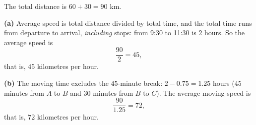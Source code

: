 The total distance is $60+30=90$ km.

\textbf{(a)} Average speed is total distance divided by total time, and the total time runs from departure to arrival, \emph{including} stops: from 9:30 to 11:30 is $2$ hours. So the average speed is
\[
\dfrac{90}{2}=\boxed{45},
\]
that is, $45$ kilometres per hour.

\textbf{(b)} The moving time excludes the $45$-minute break: $2-0.75=1.25$ hours ($45$ minutes from $A$ to $B$ and $30$ minutes from $B$ to $C$). The average moving speed is
\[
\dfrac{90}{1.25}=\boxed{72},
\]
that is, $72$ kilometres per hour.

